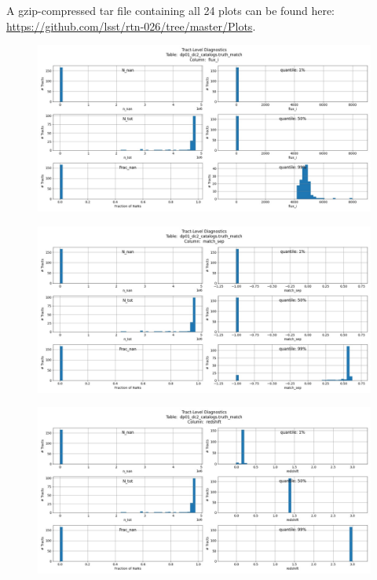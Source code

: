 \documentclass[DM,authoryear,toc]{lsstdoc}
\begin{document}
A gzip-compressed tar file containing all 24 plots can be found
here: \url{https://github.com/lsst/rtn-026/tree/master/Plots}.



\begin{figure}[h]
\centering
\includegraphics[width=1.0\linewidth]{Plots/truth_match_flux_i.pdf}
\caption{}
\label{fig:truth_match_flux_i}
\end{figure}

\begin{figure}[h]
\centering
\includegraphics[width=1.0\linewidth]{Plots/truth_match_match_sep.pdf}
\caption{}
\label{fig:truth_match_match_sep}
\end{figure}

\begin{figure}[h]
\centering
\includegraphics[width=1.0\linewidth]{Plots/truth_match_redshift.pdf}
\caption{}
\label{fig:truth_match_redshift}
\end{figure}
\end{document}
